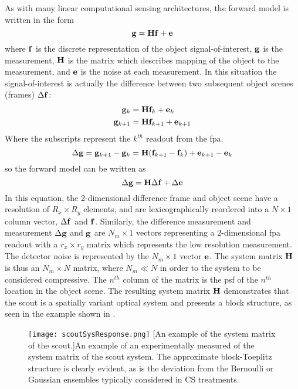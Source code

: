 As with many linear computational sensing architectures, the forward model is written in the form
%
\begin{equation}
	\displaystyle \mathbf{g} = \displaystyle \mathbf{H} \displaystyle \mathbf{f} + \displaystyle \mathbf{e}
\end{equation}
%
where $\displaystyle \mathbf{f}$ is the discrete representation of the object signal-of-interest, $\displaystyle \mathbf{g}$ is the measurement, $\displaystyle \mathbf{H}$ is the matrix which describes mapping of the object to the measurement, and $\displaystyle \mathbf{e}$ is the noise at each measurement. In this situation the signal-of-interest is actually the difference between two subsequent object scenes (frames) $\Delta \displaystyle \mathbf{f}$:
%
%
\begin{equation} 
\begin{split}
	\displaystyle \mathbf{g}_{k} &= \displaystyle \mathbf{H} \displaystyle \mathbf{f}_{k} + \displaystyle \mathbf{e}_{k} \\
	\displaystyle \mathbf{g}_{k+1} &= \displaystyle \mathbf{H} \displaystyle \mathbf{f}_{k+1} + \displaystyle \mathbf{e}_{k+1}
\end{split}
\end{equation}
%
Where the subscripts represent the $k^{th}$ readout from the \gls{fpa}.
%
\begin{equation}
	\Delta \mb{g} = \mb{g}_{k+1} - \mb{g}_{k} = \mb{H} \ap{ \mb{f}_{k+1} - \mb{f}_{k} } + \mb{e}_{k+1} - \mb{e}_{k} 
\end{equation}
%
%
so the forward model can be written as
%
\begin{equation}
	\Delta \displaystyle \mathbf{g} = \displaystyle \mathbf{H} \Delta \displaystyle \mathbf{f}  + \Delta \displaystyle \mathbf{e}
	\label{eq:scoutgHf}
\end{equation}
%
In this equation, the 2-dimensional difference frame and object scene have a resolution of $ R_x \times R_y$ elements, and are lexicographically reordered into a $N \times 1$ column vector, $\Delta \displaystyle \mathbf{f}$ and $\displaystyle \mathbf{f}$. Similarly, the difference measurement and measurement $\Delta \displaystyle \mathbf{g}$ and $\displaystyle \mathbf{g}$ are $N_m \times 1$ vectors representing a 2-dimensional \gls{fpa} readout with a $ r_x \times r_y$ matrix which represents the low resolution measurement. The detector noise is represented by the $ N_m \times 1 $ vector $\displaystyle \mathbf{e}$. The system matrix $\displaystyle \mathbf{H}$ is thus an $N_m \times N $ matrix, where $N_m \ll N$ in order to the system to be considered compressive. The $n^{th}$ column of the matrix is the \gls{psf} of the $n^{th}$ location in the object scene. The resulting system matrix $\displaystyle \mathbf{H}$ demonstrates that the \gls{scout} is a spatially variant optical system and presents a block structure, as seen in the example shown in .

\begin{sidewaysfigure}
	\texttt{[image: scoutSysResponse.png]}
	[An example of the system matrix of the \gls{scout}.]{An example of an experimentally measured of the system matrix of the \gls{scout} system. The approximate block-Toeplitz structure is clearly evident, as is the deviation from the Bernoulli or Gaussian ensembles typically considered in CS treatments. }
	\label{fig:scoutSysResponse}
\end{sidewaysfigure}


